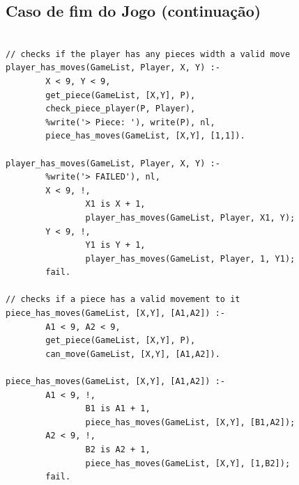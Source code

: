 \newpage

\subsection{Caso de fim do Jogo (continuação)}

\begin{lstlisting}

// checks if the player has any pieces width a valid move
player_has_moves(GameList, Player, X, Y) :-
        X < 9, Y < 9,
        get_piece(GameList, [X,Y], P),
        check_piece_player(P, Player),
        %write('> Piece: '), write(P), nl,
        piece_has_moves(GameList, [X,Y], [1,1]).

player_has_moves(GameList, Player, X, Y) :-
        %write('> FAILED'), nl,
        X < 9, !,
                X1 is X + 1,
                player_has_moves(GameList, Player, X1, Y);
        Y < 9, !,
                Y1 is Y + 1,
                player_has_moves(GameList, Player, 1, Y1);
        fail.

// checks if a piece has a valid movement to it
piece_has_moves(GameList, [X,Y], [A1,A2]) :-
        A1 < 9, A2 < 9,
        get_piece(GameList, [X,Y], P),
        can_move(GameList, [X,Y], [A1,A2]).

piece_has_moves(GameList, [X,Y], [A1,A2]) :-
        A1 < 9, !,
                B1 is A1 + 1,
                piece_has_moves(GameList, [X,Y], [B1,A2]);
        A2 < 9, !,
                B2 is A2 + 1,
                piece_has_moves(GameList, [X,Y], [1,B2]);
        fail.

\end{lstlisting}



